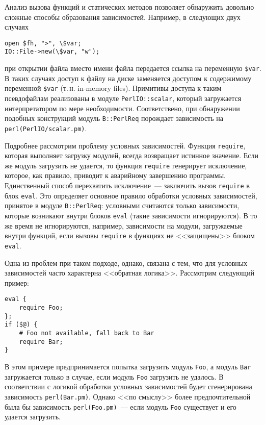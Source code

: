 \documentclass[russian,a4paper,12pt,titlepage]{article}
\begin{document}
Анализ вызова функций и статических методов позволяет обнаружить довольно сложные способы образования
зависимостей.  Например, в следующих двух случаях
\begin{verbatim}
open $fh, ">", \$var;
IO::File->new(\$var, "w");
\end{verbatim}
при открытии файла вместо имени файла передается ссылка на переменную \verb|$var|.
В таких случаях доступ к файлу на диске заменяется доступом к содержимому переменной \verb|$var| (т.\,н. in-memory files).
Примитивы доступа к таким псевдофайлам реализованы в модуле \verb|PerlIO::scalar|, который загружается интерпретатором
по мере необходимости.  Соответствено, при обнаружении подобных конструкций модуль \verb|B::PerlReq| порождает зависимость
на \verb|perl(PerlIO/scalar.pm)|.

Подробнее рассмотрим проблему условных зависимостей.  Функция \verb|require|, которая выполняет загрузку модулей, всегда
возвращает истинное значение.  Если же модуль загрузить не удается, то функция \verb|require| генерирует исключение, которое,
как правило, приводит к аварийному завершению программы.  Единственный способ перехватить исключение~--- заключить вызов
\verb|require| в блок \verb|eval|.  Это определяет основное правило обработки условных зависимостей, принятое в модуле
\verb|B::PerlReq|: условными считаются только зависимости, которые возникают внутри блоков \verb|eval| (такие зависимости игнорируются).
В то же время не игнорируются, например, зависимости на модули, загружаемые внутри функций, если вызовы \verb|require| в функциях
не <<защищены>> блоком \verb|eval|.

Одна из проблем при таком подходе, однако, связана с тем, что для условных зависимостей часто характерна <<обратная логика>>.
Рассмотрим следующий пример:
\begin{verbatim}
eval {
    require Foo;
};
if ($@) {
    # Foo not available, fall back to Bar
    require Bar;
}
\end{verbatim}
В этом примере предпринимается попытка загрузить модуль \verb|Foo|, а модуль \verb|Bar| загружается только в случае,
если модуль \verb|Foo| загрузить не удалось.  В соответствии с логикой обработки условных зависимостей будет сгенерирована
зависимость \verb|perl(Bar.pm)|.  Однако <<по смыслу>> более предпочтительной была бы зависимость \verb|perl(Foo.pm)|~---
если модуль \verb|Foo| существует и его удается загрузить.
\end{document}

